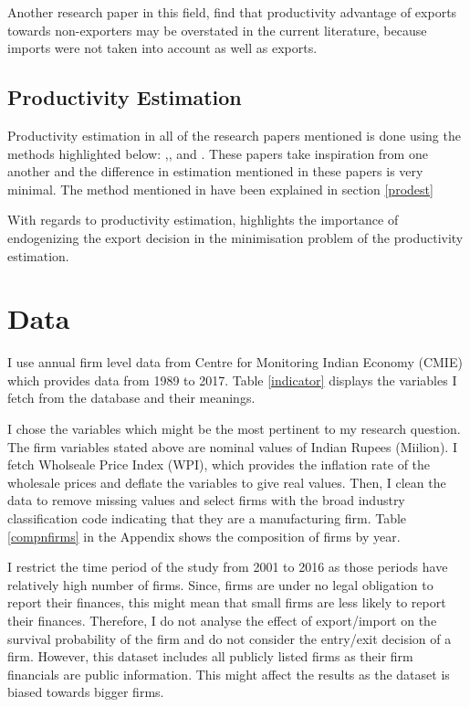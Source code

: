 \documentclass[11pt]{article}
\begin{document}
Another research paper in this field, \textcite{muuls2009imports} find
that productivity advantage of exports towards non-exporters
may be overstated in the current literature, 
because imports were not taken into account as well as exports.
\subsection{Productivity Estimation}
Productivity estimation in all of the research papers mentioned is done using
the methods highlighted below:
\textcite{olley1992dynamics},\textcite{levinsohn2003estimating},
\textcite{ackerberg2006structural} and \textcite{wooldridge2009estimating}. 
These papers take inspiration from one another and the difference in
estimation mentioned in these papers is very minimal. The method
mentioned in \textcite{olley1992dynamics}
have been explained in section \ref{prodest}

With regards to productivity estimation, \textcite{de2013detecting} highlights the importance of endogenizing
the export decision in the minimisation problem of the productivity
estimation. 

\section{Data}\label{sec:data}
I use annual firm level data from Centre for Monitoring Indian Economy
(CMIE) which provides  data from 1989 to 2017. Table \ref{indicator}
displays the variables I fetch from the database and their meanings. 
 
\begin{center}

\end{center}

I chose the variables
which might be the most pertinent to my research question. 
The firm variables stated above are nominal values of Indian Rupees
(Miilion). I fetch Wholseale Price
Index (WPI), which provides the inflation rate of the wholesale prices
and deflate the variables to give real values. Then, I clean the data
to remove missing values and select firms with the broad industry
classification code indicating that they are a manufacturing
firm.
 Table \ref{compnfirms} in the Appendix shows the composition of
firms by year.  
\begin{center}

\end{center}
 I restrict the time period of the study from 2001 to 2016 as those
 periods have  relatively high number of firms.  Since, firms
are under no legal obligation to report their finances, this might
mean  that small firms are less likely to report their
finances. Therefore, I do not analyse the effect of export/import on
the survival probability of the firm and do not consider the
entry/exit decision of a firm. However, this dataset includes all publicly listed firms as
their firm financials are public information. This might affect the 
results as the dataset is biased towards bigger firms. 
\end{document}
